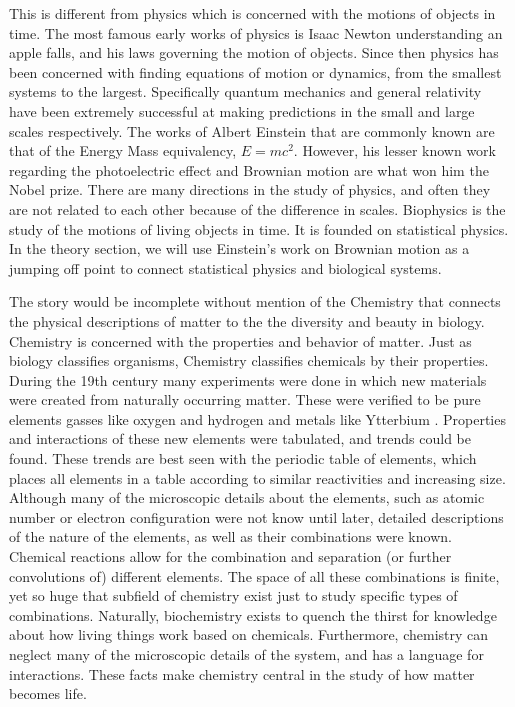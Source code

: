 \documentclass[a4paper,11pt,oneside]{book}
\begin{document}
This is different from physics which is concerned with the motions of objects in time. The most famous early works of physics is Isaac Newton understanding an apple falls, and his laws governing the motion of objects. Since then physics has been concerned with finding equations of motion or dynamics, from the smallest systems to the largest. Specifically quantum mechanics and general relativity have been extremely successful at making predictions in the small and large scales respectively. The works of Albert Einstein that are commonly known are that of the Energy Mass equivalency, $E=mc^2$. However, his lesser known work regarding the photoelectric effect and Brownian motion are what won him the Nobel prize. There are many directions in the study of physics, and often they are not related to each other because of the difference in scales. Biophysics is the study of the motions of living objects in time. It is founded on statistical physics. In the theory section, we will use Einstein's work on Brownian motion as a jumping off point to connect statistical physics and biological systems.

The story would be incomplete without mention of the Chemistry that connects the physical descriptions of matter to the the diversity and beauty in biology. Chemistry is concerned with the properties and behavior of matter.
Just as biology classifies organisms, Chemistry classifies chemicals by their properties. During the 19th century many experiments were done in which new materials were created from naturally occurring matter. These were verified to be pure elements gasses like oxygen and hydrogen and metals like Ytterbium . Properties and interactions of these new elements were tabulated, and trends could be found. These trends are best seen with the periodic table of elements, which places all elements in a table according to similar reactivities and increasing size. Although many of the microscopic details about the elements, such as atomic number or electron configuration were not know until later, detailed descriptions of the nature of the elements, as well as their combinations were known. Chemical reactions allow for the combination and separation (or further convolutions of) different elements. The space of all these combinations is finite, yet so huge that subfield of chemistry exist just to study specific types of combinations. Naturally, biochemistry exists to quench the thirst for knowledge about how living things work based on chemicals. Furthermore, chemistry can neglect many of the microscopic details of the system, and has a language for interactions. These facts make chemistry central in the study of how matter becomes life.
\end{document}
